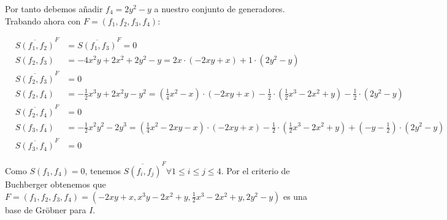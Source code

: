 Por tanto debemos añadir  $f_{4}= 2y^2-y$ a nuestro conjunto de generadores. Trabando ahora con $F=(f_{1},f_{2},f_{3},f_{4})$:

\begin{eqnarray}
\nonumber &\overline{S(f_{1},f_{2})}^{F}& =  \overline{S(f_{1},f_{3})}^{F} = 0 \\
\nonumber &S(f_{2},f_{3})& = -4x^2y + 2x^2 + 2y^2 -y = 2x\cdot(-2xy +x) + 1\cdot(2y^2 -y)\\
\nonumber &\overline{S(f_{2},f_{3})}^{F}& = 0\\
\nonumber &S(f_{2},f_{4})& = -\frac{1}{2}x^3y+2x^2y -y^2 =\left(\frac{1}{4}x^2 -x\right) \cdot(-2xy+x) - \frac{1}{2}\cdot\left(\frac{1}{2}x^3 -2x^2 +y\right) - \frac{1}{2}\cdot(2y^2 -y) \\
\nonumber &\overline{S(f_{2},f_{4})}^{F}& = 0\\
\nonumber &S(f_{3},f_{4})& = -\frac{1}{2}x^2y^2-2y^3  =\left(\frac{1}{4}x^2 -2xy - x\right) \cdot(-2xy+x) - \frac{1}{2}\cdot\left(\frac{1}{2}x^3 -2x^2 +y\right) +\left(-y-\frac{1}{2}\right)\cdot(2y^2-y) \\
\nonumber &\overline{S(f_{3},f_{4})}^{F}& = 0
\end{eqnarray}

Como $S(f_{1},f_{4})=0$, tenemos $\overline{S(f_{i},f_{j})}^{F} \forall 1\leq i\leq j\leq 4$. Por el criterio de Buchberger obtenemos que $F=(f_{1},f_{2},f_{3},f_{4}) = (-2xy+x,x^3y-2x^2+y,\frac{1}{2}x^3-2x^2+y,2y^2-y)$ es una base de Gröbner para $I$.






